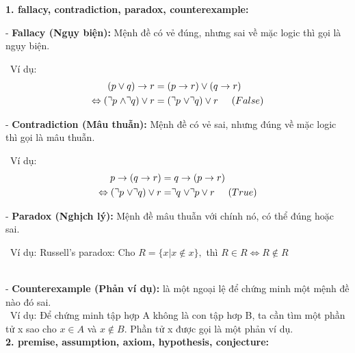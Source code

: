 \documentclass[a4paper]{article}
\begin{document}
\textbf{{\large\hspace{0.5cm} 1. fallacy, contradiction, paradox, counterexample: }}

{\large\hspace{1cm}- \textbf{Fallacy (Ngụy biện):} Mệnh đề có vẻ đúng, nhưng sai về mặc logic thì gọi là ngụy biện.
	
\ Ví dụ:
\begin{align*}
(p \vee q) \rightarrow r &= (p \rightarrow r) \vee (q \rightarrow r) \\
\Leftrightarrow (\urcorner p\hspace{0.1cm} \wedge \urcorner q) \vee r  &= (\urcorner p \hspace{0.1cm} \vee \urcorner q) \vee r \hspace{0.5cm}(False)
\end{align*}}
{\large\hspace{1cm}- \textbf{Contradiction (Mâu thuẫn):} Mệnh đề có vẻ sai, nhưng đúng về mặc logic thì gọi là mâu thuẫn.
	
\ Ví dụ: 
\begin{align*}
p \rightarrow (q \rightarrow r) &= q \rightarrow (p \rightarrow r) \\
\Leftrightarrow (\urcorner p \hspace{0.1cm} \vee \urcorner q) \vee r &= \urcorner q \hspace{0.1cm} \vee \urcorner p \vee r  \hspace{0.5cm} (True)
\end{align*}}
{\large\hspace{1cm}- \textbf{Paradox (Nghịch lý):} Mệnh đề mâu thuẫn với chính nó, có thể đúng hoặc sai.
	
\ Ví dụ: Russell's paradox: Cho $R = \{x| x\notin x \}, $ thì $ R \in R \Leftrightarrow R \notin R$}\\

{\large\hspace{1cm}- \textbf{Counterexample (Phản ví dụ):} là một ngoại lệ để chứng minh một mệnh đề nào đó sai.\\
	
\ Ví dụ: Để chứng minh tập hợp A không là con tập hơp B, ta cần tìm một phần tử x sao cho $x \in A$ và $x\notin B$. Phần tử x được gọi là một phản ví dụ.}\\

\textbf{{\large\hspace{0.5cm} 2. premise, assumption, axiom, hypothesis, conjecture: }}\\
\end{document}
